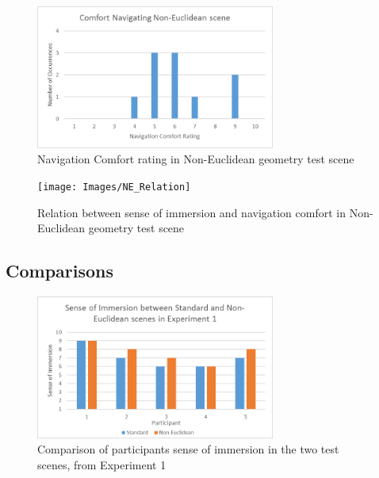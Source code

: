			\begin{figure}
				\label{exp:fig:ne_comfort}
				\includegraphics[width=0.7\textwidth]{Images/NE_Comfort}
				\centering
				\caption{Navigation Comfort rating in Non-Euclidean geometry test scene}
			\end{figure}

			\begin{figure}
				\label{exp:fig:ne_relation}
				\texttt{[image: Images/NE\_Relation]}
				\centering
				\caption{Relation between sense of immersion and navigation comfort in Non-Euclidean geometry test scene}
			\end{figure}
			\begin{multicols*}{2}

		\subsection{Comparisons}
		\label{exp:exp:comp}


			\end{multicols*}
			\begin{figure}
				\label{exp:fig:compare_immersion_exp1}
				\includegraphics[width=0.7\textwidth]{Images/Compare_Immersion_Exp_1}
				\centering
				\caption{Comparison of participants sense of immersion in the two test scenes, from Experiment 1}
			\end{figure}


